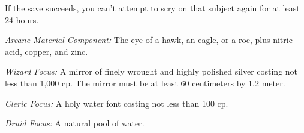 {	If the save succeeds, you can't attempt to scry on that subject again for at least 24 hours.

	\textit{Arcane Material Component:}
	The eye of a hawk, an eagle, or a roc, plus nitric acid, copper, and zinc.

	\textit{Wizard Focus:}
	A mirror of finely wrought and highly polished silver costing not less than 1,000 cp. The mirror must be at least 60 centimeters by 1.2 meter.

	\textit{Cleric Focus:}
	A holy water font costing not less than 100 cp.

	\textit{Druid Focus:}
	A natural pool of water.

}
